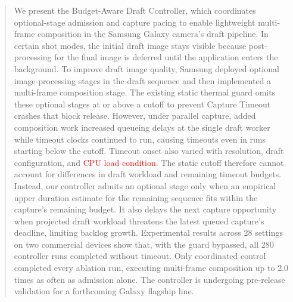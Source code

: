 \begin{abstract}
We present the Budget-Aware Draft Controller, which coordinates optional-stage admission and capture pacing to enable lightweight multi-frame composition in the Samsung Galaxy camera's draft pipeline.
In certain shot modes, the initial draft image stays visible because post-processing for the final image is deferred until the application enters the background.
To improve draft image quality, Samsung deployed optional image-processing stages in the draft sequence and then implemented a multi-frame composition stage.
The existing static thermal guard omits these optional stages at or above a cutoff to prevent Capture Timeout crashes that block release.
However, under parallel capture, added composition work increased queueing delays at the single draft worker while timeout clocks continued to run, causing timeouts even in runs starting below the cutoff.
Timeout onset also varied with resolution, draft configuration, and \textcolor{red}{CPU load condition}.
The static cutoff therefore cannot account for differences in draft workload and remaining timeout budgets.
Instead, our controller admits an optional stage only when an empirical upper duration estimate for the remaining sequence fits within the capture's remaining budget.
It also delays the next capture opportunity when projected draft workload threatens the latest queued capture's deadline, limiting backlog growth.
Experimental results across 28 settings on two commercial devices show that, with the guard bypassed, all 280 controller runs completed without timeout.
Only coordinated control completed every ablation run, executing multi-frame composition up to 2.0 times as often as admission alone.
The controller is undergoing pre-release validation for a forthcoming Galaxy flagship line.
\end{abstract}
